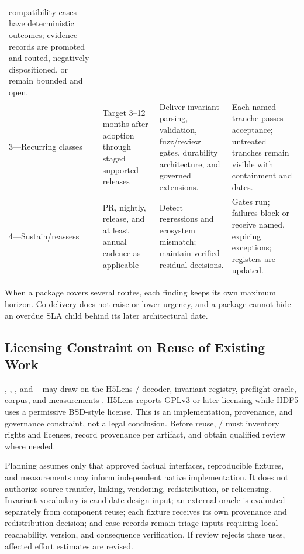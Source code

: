 \documentclass[../main.tex]{subfiles}
\begin{document}
\begin{longtable}{@{}p{0.14\widetablewidth}p{0.20\widetablewidth}p{0.27\widetablewidth}p{0.33\widetablewidth}@{}}
compatibility cases have deterministic outcomes; evidence records are promoted
and routed, negatively dispositioned, or remain bounded and open. \\
3---Recurring classes & Target 3--12 months after adoption through staged
supported releases & Deliver invariant parsing, validation, fuzz/review gates,
durability architecture, and governed extensions. & Each named tranche passes
acceptance; untreated tranches remain visible with containment and dates. \\
4---Sustain/reassess & PR, nightly, release, and at least annual cadence as
applicable & Detect regressions and ecosystem mismatch; maintain verified
residual decisions. & Gates run; failures block or receive named, expiring
exceptions; registers are updated. \\
\end{longtable}
\endgroup

When a package covers several routes, each finding keeps its own maximum
horizon. Co-delivery does not raise or lower urgency, and a package cannot hide
an overdue SLA child behind its later architectural date.

\subsection{Licensing Constraint on Reuse of Existing Work}
\label{sec:roadmap-licensing}

, , , and --
may draw on the H5Lens /  decoder, invariant registry,
preflight oracle, corpus, and measurements
\cite{h5lens,h5policy,h5policy-invariant-registry}. H5Lens reports
GPLv3-or-later licensing while HDF5 uses a permissive BSD-style license. This
is an implementation, provenance, and governance constraint, not a legal
conclusion. Before reuse, / must inventory rights and
licenses, record provenance per artifact, and obtain qualified review where
needed.

Planning assumes only that approved factual interfaces, reproducible fixtures,
and measurements may inform independent native implementation. It does not
authorize source transfer, linking, vendoring, redistribution, or relicensing.
Invariant vocabulary is candidate design input; an external oracle is evaluated
separately from component reuse; each fixture receives its own provenance and
redistribution decision; and case records remain triage inputs requiring local
reachability, version, and consequence verification. If review rejects these
uses, affected effort estimates are revised.
\end{document}
